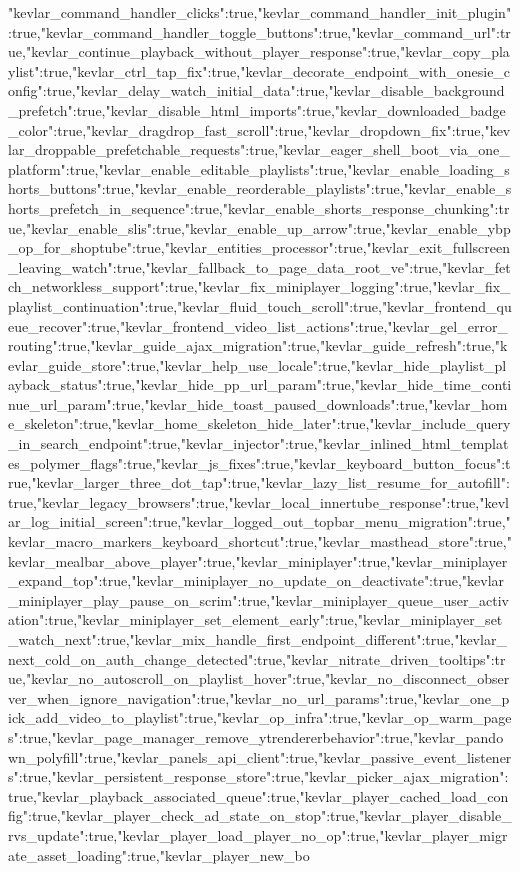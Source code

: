 {"kevlar_command_handler_clicks":true,"kevlar_command_handler_init_plugin":true,"kevlar_command_handler_toggle_buttons":true,"kevlar_command_url":true,"kevlar_continue_playback_without_player_response":true,"kevlar_copy_playlist":true,"kevlar_ctrl_tap_fix":true,"kevlar_decorate_endpoint_with_onesie_config":true,"kevlar_delay_watch_initial_data":true,"kevlar_disable_background_prefetch":true,"kevlar_disable_html_imports":true,"kevlar_downloaded_badge_color":true,"kevlar_dragdrop_fast_scroll":true,"kevlar_dropdown_fix":true,"kevlar_droppable_prefetchable_requests":true,"kevlar_eager_shell_boot_via_one_platform":true,"kevlar_enable_editable_playlists":true,"kevlar_enable_loading_shorts_buttons":true,"kevlar_enable_reorderable_playlists":true,"kevlar_enable_shorts_prefetch_in_sequence":true,"kevlar_enable_shorts_response_chunking":true,"kevlar_enable_slis":true,"kevlar_enable_up_arrow":true,"kevlar_enable_ybp_op_for_shoptube":true,"kevlar_entities_processor":true,"kevlar_exit_fullscreen_leaving_watch":true,"kevlar_fallback_to_page_data_root_ve":true,"kevlar_fetch_networkless_support":true,"kevlar_fix_miniplayer_logging":true,"kevlar_fix_playlist_continuation":true,"kevlar_fluid_touch_scroll":true,"kevlar_frontend_queue_recover":true,"kevlar_frontend_video_list_actions":true,"kevlar_gel_error_routing":true,"kevlar_guide_ajax_migration":true,"kevlar_guide_refresh":true,"kevlar_guide_store":true,"kevlar_help_use_locale":true,"kevlar_hide_playlist_playback_status":true,"kevlar_hide_pp_url_param":true,"kevlar_hide_time_continue_url_param":true,"kevlar_hide_toast_paused_downloads":true,"kevlar_home_skeleton":true,"kevlar_home_skeleton_hide_later":true,"kevlar_include_query_in_search_endpoint":true,"kevlar_injector":true,"kevlar_inlined_html_templates_polymer_flags":true,"kevlar_js_fixes":true,"kevlar_keyboard_button_focus":true,"kevlar_larger_three_dot_tap":true,"kevlar_lazy_list_resume_for_autofill":true,"kevlar_legacy_browsers":true,"kevlar_local_innertube_response":true,"kevlar_log_initial_screen":true,"kevlar_logged_out_topbar_menu_migration":true,"kevlar_macro_markers_keyboard_shortcut":true,"kevlar_masthead_store":true,"kevlar_mealbar_above_player":true,"kevlar_miniplayer":true,"kevlar_miniplayer_expand_top":true,"kevlar_miniplayer_no_update_on_deactivate":true,"kevlar_miniplayer_play_pause_on_scrim":true,"kevlar_miniplayer_queue_user_activation":true,"kevlar_miniplayer_set_element_early":true,"kevlar_miniplayer_set_watch_next":true,"kevlar_mix_handle_first_endpoint_different":true,"kevlar_next_cold_on_auth_change_detected":true,"kevlar_nitrate_driven_tooltips":true,"kevlar_no_autoscroll_on_playlist_hover":true,"kevlar_no_disconnect_observer_when_ignore_navigation":true,"kevlar_no_url_params":true,"kevlar_one_pick_add_video_to_playlist":true,"kevlar_op_infra":true,"kevlar_op_warm_pages":true,"kevlar_page_manager_remove_ytrendererbehavior":true,"kevlar_pandown_polyfill":true,"kevlar_panels_api_client":true,"kevlar_passive_event_listeners":true,"kevlar_persistent_response_store":true,"kevlar_picker_ajax_migration":true,"kevlar_playback_associated_queue":true,"kevlar_player_cached_load_config":true,"kevlar_player_check_ad_state_on_stop":true,"kevlar_player_disable_rvs_update":true,"kevlar_player_load_player_no_op":true,"kevlar_player_migrate_asset_loading":true,"kevlar_player_new_bo}
